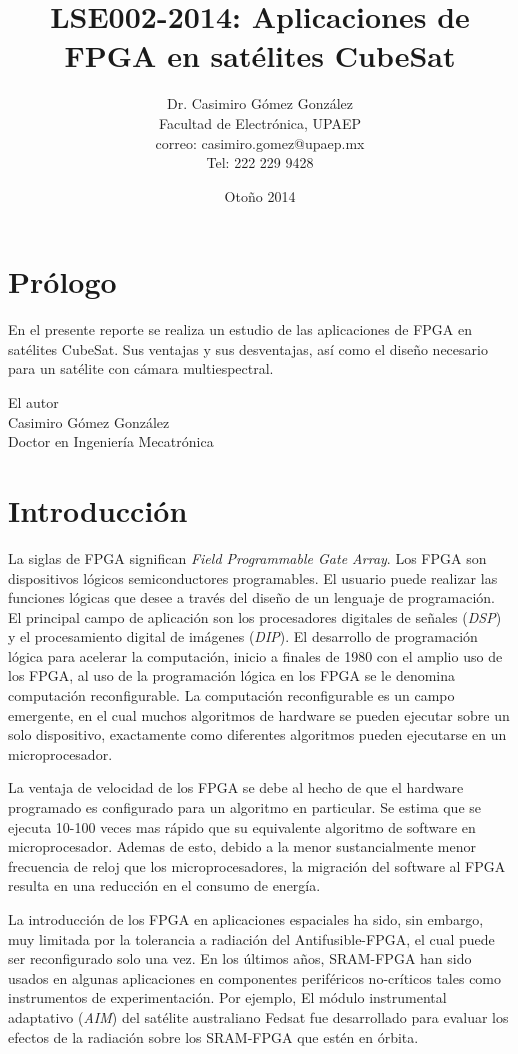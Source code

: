 \documentclass[12pt, twoside]{report}
\title{LSE002-2014: Aplicaciones de FPGA en satélites CubeSat}
\author{Dr. Casimiro Gómez González\\
	Facultad de Electrónica, UPAEP\\
               correo: casimiro.gomez@upaep.mx\\
               Tel: 222 229 9428}
\date{Otoño 2014}
\begin{document}
\maketitle

\chapter*{Prólogo}

En el presente reporte se realiza un estudio de las aplicaciones de FPGA en satélites CubeSat. Sus ventajas y sus desventajas, así como el diseño necesario para un satélite con cámara multiespectral. 


\begin{flushright}
	
	El autor\\
	Casimiro Gómez González\\
	Doctor en Ingeniería Mecatrónica
\end{flushright}

\tableofcontents


\chapter{Introducción}

La siglas de FPGA significan \textit{Field Programmable Gate Array}. Los FPGA son dispositivos  lógicos semiconductores programables. El usuario puede realizar las funciones lógicas que desee a través del diseño de un lenguaje de programación. El principal campo de aplicación son los procesadores digitales de señales (\textit{DSP}) y el procesamiento digital de imágenes (\textit{DIP}). El desarrollo de programación lógica para acelerar la computación, inicio a finales de 1980 con el amplio uso de los FPGA, al uso de la programación lógica en los FPGA se le denomina computación reconfigurable. La computación reconfigurable es un campo emergente, en el cual muchos algoritmos de hardware se pueden ejecutar sobre un solo dispositivo, exactamente como diferentes algoritmos pueden ejecutarse en un microprocesador.

La ventaja de velocidad de los FPGA se debe al hecho de que el hardware programado es configurado para un algoritmo en particular. Se estima que se ejecuta 10-100 veces mas rápido que su equivalente algoritmo de software en microprocesador. Ademas de esto, debido a la menor sustancialmente menor frecuencia de reloj que los microprocesadores, la migración del software al FPGA resulta en una reducción en el consumo de energía.

La introducción de los FPGA en aplicaciones espaciales ha sido, sin embargo, muy limitada por la tolerancia a radiación del Antifusible-FPGA, el cual puede ser reconfigurado solo una vez. En los últimos años, SRAM-FPGA  han sido usados en algunas aplicaciones en componentes periféricos no-críticos tales como instrumentos de experimentación. Por ejemplo, El módulo instrumental adaptativo (\textit{AIM}) del satélite australiano Fedsat fue desarrollado para evaluar los efectos de la radiación sobre los SRAM-FPGA que estén en órbita. 





\end{document}
